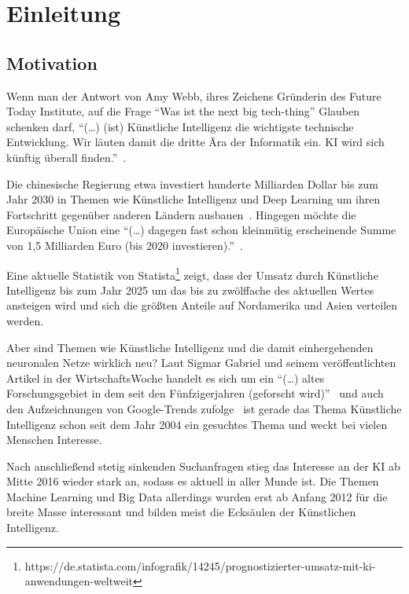 \chapter{Einleitung}
\label{ch:einleitung}

\section{Motivation}
\label{sec:motivation}
Wenn man der Antwort von Amy Webb, ihres Zeichens Gründerin des Future Today Institute, auf die Frage \enquote{Was ist
the next big tech-thing} Glauben schenken darf, \enquote{(\ldots) (ist) Künstliche Intelligenz die wichtigste technische
Entwicklung. Wir läuten damit die dritte Ära der Informatik ein. KI wird sich künftig überall
finden.}~\cite{article_einleitung_dub_aw}.

Die chinesische Regierung etwa investiert hunderte Milliarden Dollar bis zum Jahr 2030 in Themen wie Künstliche
Intelligenz und Deep Learning um ihren Fortschritt gegenüber anderen Ländern ausbauen~\cite{article_einleitung_css}.
Hingegen möchte die Europäische Union eine \enquote{(\ldots) dagegen fast schon kleinmütig erscheinende Summe von 1,5
Milliarden Euro (bis 2020 investieren).}~\cite{article_einleitung_ww_sg}.

Eine aktuelle Statistik von Statista\footnote{https://de.statista.com/infografik/14245/prognostizierter-umsatz-mit-ki-anwendungen-weltweit}
zeigt, dass der Umsatz durch Künstliche Intelligenz bis zum Jahr 2025 um das bis zu zwölffache des aktuellen Wertes
ansteigen wird und sich die größten Anteile auf Nordamerika und Asien verteilen werden.

Aber sind Themen wie Künstliche Intelligenz und die damit einhergehenden neuronalen Netze wirklich neu? Laut Sigmar
Gabriel und seinem veröffentlichten Artikel in der WirtschaftsWoche handelt es sich um ein \enquote{(\ldots) altes
Forschungsgebiet in dem seit den Fünfzigerjahren (geforscht wird)}~\cite{article_einleitung_ww_sg} und auch den
Aufzeichnungen von Google-Trends zufolge~\cite{online_einleitung_googletrends} ist gerade das Thema Künstliche
Intelligenz schon seit dem Jahr 2004 ein gesuchtes Thema und weckt bei vielen Menschen Interesse.

Nach anschließend stetig sinkenden Suchanfragen stieg das Interesse an der KI ab Mitte 2016 wieder stark an, sodass es
aktuell in aller Munde ist. Die Themen Machine Learning und Big Data allerdings wurden erst ab Anfang 2012 für die
breite Masse interessant und bilden meist die Ecksäulen der Künstlichen Intelligenz.

